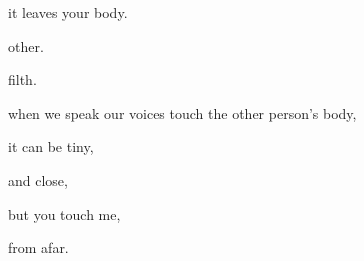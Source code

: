 \documentclass[extrafontsizes, 48pt]{memoir}
\newcommand\blankpage{%
    \null
    \thispagestyle{empty}%
    \addtocounter{page}{-1}%
    \newpage}
\begin{document}
	\begin{minipage}{.6\textwidth}
	it leaves your body.
	\end{minipage}
	\newpage

	\begin{minipage}{.6\textwidth}
	other.
	\end{minipage}
	\newpage

	\begin{minipage}{.6\textwidth}
	filth.
	\afterpage{\blankpage}
	\end{minipage}
	\newpage

	\begin{minipage}{.6\textwidth}
	when we speak our voices touch the other person's body,
	\end{minipage}
	\newpage

	\begin{minipage}{.6\textwidth}
	it can be tiny,
	\end{minipage}
	\newpage

	\begin{minipage}{.6\textwidth}
	and close,
	\end{minipage}
	\newpage

	\begin{minipage}{.6\textwidth}
	but you touch me,
	\end{minipage}
	\newpage

	\begin{minipage}{.6\textwidth}
	from afar.
	\afterpage{\blankpage}
	\end{minipage}
	\newpage
\end{document}

